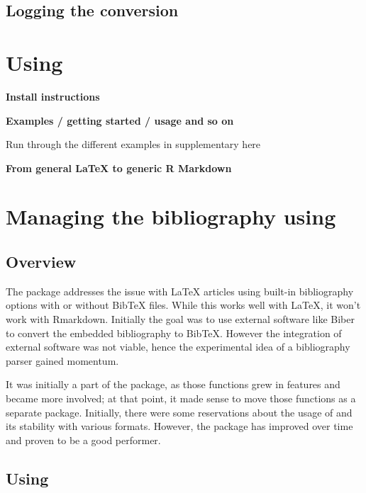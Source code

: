 \hypertarget{logging-the-conversion}{%
\subsection{Logging the conversion}\label{logging-the-conversion}}

\hypertarget{using}{%
\section{\texorpdfstring{Using }{Using }}\label{using}}

\textbf{Install instructions}

\textbf{Examples / getting started / usage and so on}

Run through the different examples in supplementary here

\textbf{From general LaTeX to generic R Markdown}

\hypertarget{managing-the-bibliography-using}{%
\section{\texorpdfstring{Managing the bibliography using }{Managing the bibliography using }}\label{managing-the-bibliography-using}}

\hypertarget{overview}{%
\subsection{Overview}\label{overview}}

The  package addresses the issue with LaTeX articles using built-in bibliography options with or without BibTeX files. While this works well with LaTeX, it won't work with Rmarkdown. Initially the goal was to use external software like Biber to convert the embedded bibliography to BibTeX.
However the integration of external software was not viable, hence the experimental idea of a bibliography parser gained momentum.

It was initially a part of the  package, as those functions grew in features and became more involved; at that point, it made sense to move those functions as a separate package. Initially, there were some reservations about
the usage of  and its stability with various formats. However, the package has improved over time and proven to be a good performer.

\hypertarget{using-1}{%
\subsection{\texorpdfstring{Using }{Using }}\label{using-1}}

